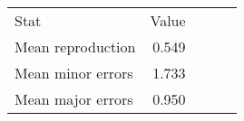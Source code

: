 \begin{tabular}{lrrrr}
\hline\hline
Stat & Value \\
Mean reproduction & 0.549 \\
Mean minor errors & 1.733 \\
Mean major errors & 0.950 \\
\hline\hline
\end{tabular}
